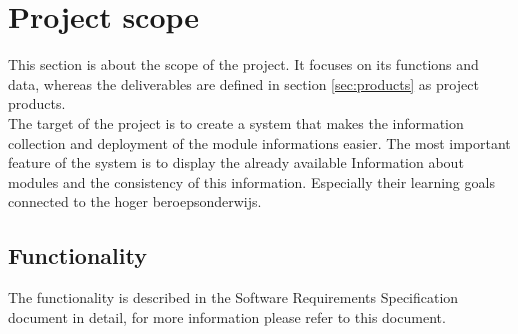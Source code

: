\section{Project scope}
This section is about the scope of the project. It focuses on its functions and data, whereas the deliverables
are defined in section \eqref{sec:products} as project products.
\newline \\
The target of the project is to create a system that makes the information collection and deployment of the module informations
easier. The most important feature of the system is to display the already available Information about modules and the consistency
of this information. Especially their learning goals connected to the hoger beroepsonderwijs.
    
    \subsection{Functionality}
    The functionality is described in the Software Requirements Specification document in detail,
    for more information please refer to this document.


